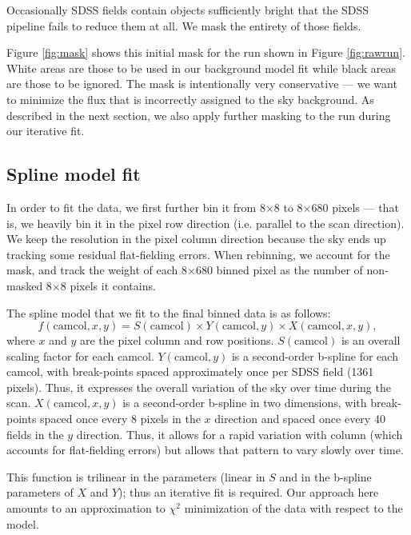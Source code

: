 \documentclass[10pt,preprint]{aastex}
\begin{document}
Occasionally SDSS fields contain objects sufficiently bright that the
SDSS pipeline fails to reduce them at all.  We mask the entirety of
those fields.

Figure \ref{fig:mask} shows this initial mask for the run shown in
Figure \ref{fig:rawrun}. White areas are those to be used in our
background model fit while black areas are those to be ignored. The
mask is intentionally very conservative --- we want to minimize the
flux that is incorrectly assigned to the sky background.  As described
in the next section, we also apply further masking to the run during
our iterative fit.

\subsection{Spline model fit}
\label{sec:spline}

In order to fit the data, we first further bin it from 8$\times$8 to
8$\times$680 pixels --- that is, we heavily bin it in the pixel row
direction (i.e. parallel to the scan direction).  We keep the
resolution in the pixel column direction because the sky ends up
tracking some residual flat-fielding errors. When rebinning, we
account for the mask, and track the weight of each 8$\times$680 binned
pixel as the number of non-masked 8$\times$8 pixels it contains.

The spline model that we fit to the final binned data is as follows:
\begin{equation}
\label{skyspline}
    f(\mathrm{camcol}, x, y) = S(\mathrm{camcol}) \times
    Y(\mathrm{camcol}, y) \times X(\mathrm{camcol}, x, y),
\end{equation}
where $x$ and $y$ are the pixel column and row positions.
$S(\mathrm{camcol})$ is an overall scaling factor for each
camcol. $Y(\mathrm{camcol}, y)$ is a second-order b-spline for each
camcol, with break-points spaced approximately once per SDSS field
(1361 pixels). Thus, it expresses the overall variation of the sky
over time during the scan.  $X(\mathrm{camcol}, x, y)$ is a
second-order b-spline in two dimensions, with break-points spaced once
every 8 pixels in the $x$ direction and spaced once every 40 fields in
the $y$ direction.  Thus, it allows for a rapid variation with column
(which accounts for flat-fielding errors) but allows that pattern to
vary slowly over time.

This function is trilinear in the parameters (linear in $S$ and in the
b-spline parameters of $X$ and $Y$); thus an iterative fit is
required.  Our approach here amounts to an approximation to $\chi^2$
minimization of the data with respect to the model.  
\end{document}
